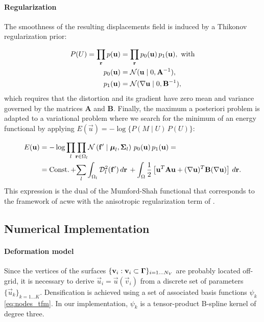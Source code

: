 \paragraph*{Regularization}
The smoothness of the resulting displacements field is induced by a Thikonov regularization
  prior:

  \begin{align}
  P(U) = \underset{\vec{r}}{\prod}\, p(\vec{u}) &=
  \underset{\vec{r}}{\prod}\, p_0(\vec{u}) \, p_1(\vec{u}), \text{ with} \\
  p_0(\vec{u}) &= \mathcal{N}( \vec{u} \mid 0, \mathbf{A}^{-1}), \notag\\
  p_1(\vec{u}) &= \mathcal{N}(  \nabla \vec{u} \mid 0, \mathbf{B}^{-1}),
  \label{eq:thikonov}
  \end{align}
 which requires that the distortion and its gradient have zero
  mean and variance governed by the matrices $\mathbf{A}$ and $\mathbf{B}$.
Finally, the maximum a posteriori problem is adapted to a variational problem where we search for
  the minimum of an energy functional by applying $E(\vec{u}) = -\log \{P( M \mid U) \, P(U)\}$:

  \begin{align}
  E(\vec{u}) &= -\log \underset{l}{\prod}
  \underset{\vec{r} \in \Omega_l}{\prod}
  \mathcal{N} \left( \vec{f}' \mid \boldsymbol{\mu}_l, \boldsymbol{\Sigma}_l \right)\,p_0( \vec{u})\,p_1( \vec{u}) = \notag\\ &=
  \const + \underset{l}{\sum} \int_{\Omega_l} \mdist{f'}{l} \,d\vec{r} \, +   \int_{\Omega} \frac12 \left[ \vec{u}^T \mathbf{A} \vec{u} + (\nabla \vec{u})^T \mathbf{B} (\nabla \vec{u}) \right] \,d\vec{r}.
  \label{eq:energy}
  \end{align}
This expression is the dual of the Mumford-Shah functional that corresponds
  to the framework of \acrlong*{acwe} \citep{chan_active_2001}
  with the anisotropic regularization term of \cite{nagel_investigation_1986}.


\subsection{Numerical Implementation}
\label{sec:numerical_implementation}

\paragraph*{Deformation model}\label{sec:deformation_model}
Since the vertices of the surfaces $\{\mathbf{v}_i: \mathbf{v}_i \subset \boldsymbol{\Gamma} \}_{i=1 \ldots N_V}$
  are probably located off-grid, it is necessary to derive $\vec{u}_i = \vec{u}(\vec{v}_i)$ from a discrete set of parameters
  $\{\vec{u}_k\}_{k=1 \ldots K}$.
Densification is achieved using a set of associated basis functions $\psi_k$ \eqref{eq:nodes_tfm}.
In our implementation, $\psi_k$ is a tensor-product B-spline kernel of degree three.

